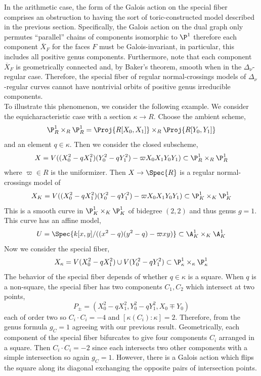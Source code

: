 In the arithmetic case, the form of the Galois action on the special fiber comprises an obstruction to having the sort of toric-constructed model described in the previous section. Specifically, the Galois action on the dual graph only permutes ``parallel'' chains of components isomorphic to $\P^1$ therefore each component $\overline{X}_F$ for the faces $F$ must be Galois-invariant, in particular, this includes all positive genus components. Furthermore, note that each component $\overline{X}_F$ is geometrically connected and, by Baker's theorem, smooth when in the $\Delta_\nu$-regular case. Therefore, the special fiber of regular normal-crossings models of $\Delta_\nu$-regular curves cannot have nontrivial orbits of positive genus irreducible components.  
\bigskip\\
To illustrate this phenomenon, we consider the following example. We consider the equicharacteristic case with a section $\kappa \to R$. Choose the ambient scheme,
\[ \P^1_R \times_R \P^1_R = \Proj{R[X_0, X_1]} \times_R \Proj{R[Y_0, Y_1]} \]
and an element $q \in \kappa$. Then we consider the closed subscheme,
\[ X = V((X_0^2 - q X_1^2)(Y_0^2 - q Y_1^2) - \varpi X_0 X_1 Y_0 Y_1) \subset \P^1_R \times_R \P^1_R \] 
where $\varpi \in R$ is the uniformizer. Then $X \to \Spec{R}$ is a regular normal-crossings model of
\[ X_K = V((X_0^2 - q X_1^2)(Y_0^2 - q Y_1^2) - \varpi X_0 X_1 Y_0 Y_1) \subset \P^1_K \times_K \P^1_K \]
This is a smooth curve in $\P^1_K \times_K \P^1_K$ of bidegree $(2, 2)$ and thus genus $g = 1$.
This curve has an affine model,
\[ U = \Spec{k[x, y]/((x^2 - q)(y^2 - q) - \varpi xy)} \subset \A^1_K \times_K \A^1_K \]
Now we consider the special fiber,
\[ X_\kappa = V(X_0^2 - q X_1^2) \cup V(Y_0^2 - q Y_1^2) \subset \P^1_\kappa \times_\kappa \P^1_\kappa \]
The behavior of the special fiber depends of whether $q \in \kappa$ is a square. When $q$ is a non-square, the special fiber has two components $C_1, C_2$ which intersect at two points,
\[ P_{\pm} = (X_0^2 - q X_1^2, Y_0^2 - q Y_1^2, X_0 \mp Y_0) \]
each of order two so $C_i \cdot C_i = -4$ and $[\kappa(C_i) : \kappa] = 2$. Therefore, from the genus formula $g_C = 1$ agreeing with our previous result. Geometrically, each component of the special fiber bifurcates to give four components $C_i$ arranged in a square. Then $C_i \cdot C_i = -2$ since each intersects two other components with a simple intersection so again $g_C = 1$. However, there is a Galois action which flips the square along its diagonal exchanging the opposite pairs of intersection points.
